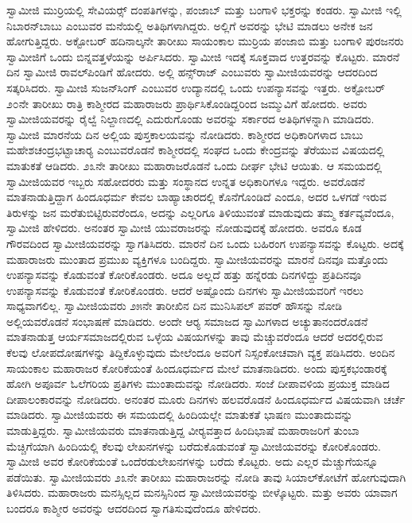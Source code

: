  ಸ್ವಾಮೀಜಿ ಮುರ‍್ರಿಯಲ್ಲಿ ಸೇವಿಯರ್ಸ್‍‍ ದಂಪತಿಗಳನ್ನು, ಪಂಜಾಬ್ ಮತ್ತು ಬಂಗಾಳಿ ಭಕ್ತರನ್ನು ಕಂಡರು. ಸ್ವಾಮೀಜಿ ಇಲ್ಲಿ ನಿಬಾರನ್‍ಬಾಬು ಎಂಬುವರ ಮನೆಯಲ್ಲಿ ಅತಿಥಿಗಳಾಗಿದ್ದರು. ಅಲ್ಲಿಗೆ ಅವರನ್ನು ಭೇಟಿ ಮಾಡಲು ಅನೇಕ ಜನ ಹೋಗುತ್ತಿದ್ದರು. ಅಕ್ಟೋಬರ್ ಹದಿನಾಲ್ಕನೇ ತಾರೀಖು ಸಾಯಂಕಾಲ ಮುರ‍್ರಿಯ ಪಂಜಾಬಿ ಮತ್ತು ಬಂಗಾಳಿ ಪುರಜನರು ಸ್ವಾಮೀಜಿಗೆ ಒಂದು ಬಿನ್ನವತ್ತಳೆಯನ್ನು ಅರ್ಪಿಸಿದರು. ಸ್ವಾಮೀಜಿ ಇದಕ್ಕೆ ಸೂಕ್ತವಾದ ಉತ್ತರವನ್ನು ಕೊಟ್ಟರು. ಮಾರನೆ ದಿನ ಸ್ವಾಮೀಜಿ ರಾವಲ್‍ಪಿಂಡಿಗೆ ಹೋದರು. ಅಲ್ಲಿ ಹನ್ಸ್‌ರಾಜ್ ಎಂಬುವರು ಸ್ವಾಮೀಜಿಯವರನ್ನು ಆದರದಿಂದ ಸತ್ಕರಿಸಿದರು. ಸ್ವಾಮೀಜಿ ಸುಜನ್‍ಸಿಂಗ್ ಎಂಬುವರ ಉದ್ಯಾನದಲ್ಲಿ ಒಂದು ಉಪನ್ಯಾಸವನ್ನು ಇತ್ತರು. ಅಕ್ಟೋಬರ್ ೨೦ನೇ ತಾರೀಖು ರಾತ್ರಿ ಕಾಶ್ಮೀರದ ಮಹಾರಾಜರು ಪ್ರಾರ್ಥಿಸಿಕೊಂಡಿದ್ದರಿಂದ ಜಮ್ಮುವಿಗೆ ಹೋದರು. ಅವರು ಸ್ವಾಮೀಜಿಯವರನ್ನು ರೈಲ್ವೆ ನಿಲ್ದಾಣದಲ್ಲಿ ಎದುರುಗೊಂಡು ಅವರನ್ನು ಸರ್ಕಾರದ ಅತಿಥಿಗಳನ್ನಾಗಿ ಮಾಡಿದರು. ಸ್ವಾಮೀಜಿ ಮಾರನೆಯ ದಿನ ಅಲ್ಲಿಯ ಪುಸ್ತಕಾಲಯವನ್ನು ನೋಡಿದರು. ಕಾಶ್ಮೀರದ ಅಧಿಕಾರಿಗಳಾದ ಬಾಬು ಮಹೇಶಚಂದ್ರಭಟ್ಟಾಚಾರ‍್ಯ ಎಂಬುವರೊಡನೆ ಕಾಶ್ಮೀರದಲ್ಲಿ ಸಂಘದ ಒಂದು ಕೇಂದ್ರವನ್ನು ತೆರೆಯುವ ವಿಷಯದಲ್ಲಿ ಮಾತುಕತೆ ಆಡಿದರು. ೨೩ನೇ ತಾರೀಖು ಮಹಾರಾಜರೊಡನೆ ಒಂದು ದೀರ್ಘ ಭೇಟಿ ಆಯಿತು. ಆ ಸಮಯದಲ್ಲಿ ಸ್ವಾಮೀಜಿಯವರ ಇಬ್ಬರು ಸಹೋದರರು ಮತ್ತು ಸಂಸ್ಥಾನದ ಉನ್ನತ ಅಧಿಕಾರಿಗಳೂ ಇದ್ದರು. ಅವರೊಡನೆ ಮಾತನಾಡುತ್ತಿದ್ದಾಗ ಹಿಂದೂಧರ್ಮ ಕೇವಲ ಬಾಹ್ಯಾಚಾರದಲ್ಲಿ ಕೊನೆಗೊಂಡಿದೆ ಎಂದೂ, ಅದರ ಒಳಗಡೆ ಇರುವ ತಿರುಳನ್ನು ಜನ ಮರೆತುಬಿಟ್ಟಿರುವರೆಂದೂ, ಅದನ್ನು ಎಲ್ಲರಿಗೂ ತಿಳಿಯುವಂತೆ ಮಾಡುವುದು ತಮ್ಮ ಕರ್ತವ್ಯವೆಂದೂ, ಸ್ವಾಮೀಜಿ ಹೇಳಿದರು. ಅನಂತರ ಸ್ವಾಮೀಜಿ ಯುವರಾಜರನ್ನು ನೋಡುವುದಕ್ಕೆ ಹೋದರು. ಅವರೂ ಕೂಡ ಗೌರವದಿಂದ ಸ್ವಾಮೀಜಿಯವರನ್ನು ಸ್ವಾಗತಿಸಿದರು. ಮಾರನೆ ದಿನ ಒಂದು ಬಹಿರಂಗ ಉಪನ್ಯಾಸವನ್ನು ಕೊಟ್ಟರು. ಅದಕ್ಕೆ ಮಹಾರಾಜರು ಮುಂತಾದ ಪ್ರಮುಖ ವ್ಯಕ್ತಿಗಳೂ ಬಂದಿದ್ದರು. ಸ್ವಾಮೀಜಿಯವರನ್ನು ಮಾರನೆ ದಿನವೂ ಮತ್ತೊಂದು ಉಪನ್ಯಾಸವನ್ನು ಕೊಡುವಂತೆ ಕೋರಿಕೊಂಡರು. ಅದೂ ಅಲ್ಲದೆ ಹತ್ತು ಹನ್ನೆರಡು ದಿನಗಳಿದ್ದು ಪ್ರತಿದಿನವೂ ಉಪನ್ಯಾಸವನ್ನು ಕೊಡುವಂತೆ ಕೋರಿಕೊಂಡರು. ಆದರೆ ಅಷ್ಟೊಂದು ದಿನಗಳು ಸ್ವಾಮೀಜಿಯವರಿಗೆ ಇರಲು ಸಾಧ್ಯವಾಗಲಿಲ್ಲ. ಸ್ವಾಮೀಜಿಯವರು ೨೫ನೇ ತಾರೀಖಿನ ದಿನ ಮುನಿಸಿಪಲ್ ಪವರ್ ಹೌಸನ್ನು ನೋಡಿ ಅಲ್ಲಿಯವರೊಡನೆ ಸಂಭಾಷಣೆ ಮಾಡಿದರು. ಅಂದೇ ಆರ‍್ಯ ಸಮಾಜದ ಸ್ವಾಮಿಗಳಾದ ಅಚ್ಯುತಾನಂದರೊಡನೆ ಮಾತನಾಡುತ್ತ ಆರ್ಯಸಮಾಜದಲ್ಲಿರುವ ಒಳ್ಳೆಯ ವಿಷಯಗಳನ್ನು ತಾವು ಮೆಚ್ಚುವರೆಂದೂ ಆದರೆ ಅದರಲ್ಲಿರುವ ಕೆಲವು ಲೋಪದೋಷಗಳನ್ನು ತಿದ್ದಿಕೊಳ್ಳುವುದು ಮೇಲೆಂದೂ‌ ಅವರಿಗೆ ನಿಸ್ಸಂಕೋಚವಾಗಿ ವ್ಯಕ್ತ ಪಡಿಸಿದರು. ಅಂದಿನ ಸಾಯಂಕಾಲ ಮಹಾರಾಜರ ಕೋರಿಕೆಯಂತೆ ಹಿಂದೂಧರ್ಮದ ಮೇಲೆ ಮಾತನಾಡಿದರು. ಅಂದು ಪುಸ್ತಕಭಂಡಾರಕ್ಕೆ ಹೋಗಿ ಅಪೂರ್ವ ಓಲೆಗರಿಯ ಪ್ರತಿಗಳು ಮುಂತಾದುವನ್ನು ನೋಡಿದರು. ಸಂಜೆ ದೀಪಾವಳಿಯ ಪ್ರಯುಕ್ತ ಮಾಡಿದ ದೀಪಾಲಂಕಾರವನ್ನು ನೋಡಿದರು. ಅನಂತರ ಮೂರು ದಿನಗಳು ಹಲವರೊಡನೆ ಹಿಂದೂಧರ್ಮದ ವಿಷಯವಾಗಿ ಚರ್ಚೆ ಮಾಡಿದರು. ಸ್ವಾಮೀಜಿಯವರು ಈ ಸಮಯದಲ್ಲಿ ಹಿಂದಿಯಲ್ಲೇ ಮಾತುಕತೆ ಭಾಷಣ ಮುಂತಾದುವನ್ನು ಮಾಡುತ್ತಿದ್ದರು. ಸ್ವಾಮೀಜಿಯವರು ಮಾತನಾಡುತ್ತಿದ್ದ ವೀರ‍್ಯವತ್ತಾದ ಹಿಂದಿಭಾಷೆ ಮಹಾರಾಜರಿಗೆ ತುಂಬಾ ಮೆಚ್ಚಿಗೆಯಾಗಿ ಹಿಂದಿಯಲ್ಲಿ ಕೆಲವು ಲೇಖನಗಳನ್ನು ಬರೆದುಕೊಡುವಂತೆ ಸ್ವಾಮೀಜಿಯವರನ್ನು ಕೋರಿಕೊಂಡರು. ಸ್ವಾಮೀಜಿ ಅವರ ಕೋರಿಕೆಯಂತೆ ಒಂದೆರಡು\break ಲೇಖನಗಳನ್ನು ಬರೆದು ಕೊಟ್ಟರು. ಅದು ಎಲ್ಲರ ಮೆಚ್ಚುಗೆಯನ್ನೂ ಪಡೆಯಿತು. ಸ್ವಾಮೀಜಿಯವರು ೨೩ನೇ ತಾರೀಖು ಮಹಾರಾಜರನ್ನು ನೋಡಿ ತಾವು ಸಿಯಾಲ್‍ಕೋಟೆಗೆ ಹೋಗುವುದಾಗಿ ತಿಳಿಸಿದರು. ಮಹಾರಾಜರು ಮನಸ್ಸಿಲ್ಲದ ಮನಸ್ಸಿನಿಂದ ಸ್ವಾಮೀಜಿಯವರನ್ನು ಬೀಳ್ಕೊಟ್ಟರು. ಮತ್ತು ಅವರು ಯಾವಾಗ ಬಂದರೂ ಕಾಶ್ಮೀರ ಅವರನ್ನು ಆದರದಿಂದ ಸ್ವಾಗತಿಸುವುದೆಂದೂ ಹೇಳಿದರು. 

